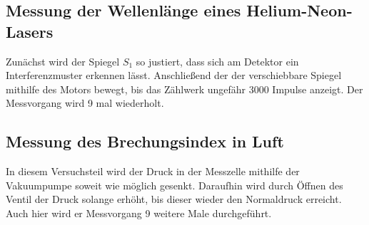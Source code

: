 \subsection{Messung der Wellenlänge eines Helium-Neon-Lasers}
\label{sec:WL}
Zunächst wird der Spiegel $S_1$ so justiert, dass sich am Detektor ein Interferenzmuster erkennen lässt.
Anschließend der der verschiebbare Spiegel mithilfe des Motors bewegt, bis das Zählwerk ungefähr $3000$ Impulse anzeigt.
Der Messvorgang wird 9 mal wiederholt.

\subsection{Messung des Brechungsindex in Luft}
In diesem Versuchsteil wird der Druck in der Messzelle mithilfe der Vakuumpumpe soweit wie möglich gesenkt.
Daraufhin wird durch Öffnen des Ventil der Druck solange erhöht, bis dieser wieder den Normaldruck erreicht.
Auch hier wird er Messvorgang 9 weitere Male durchgeführt.
